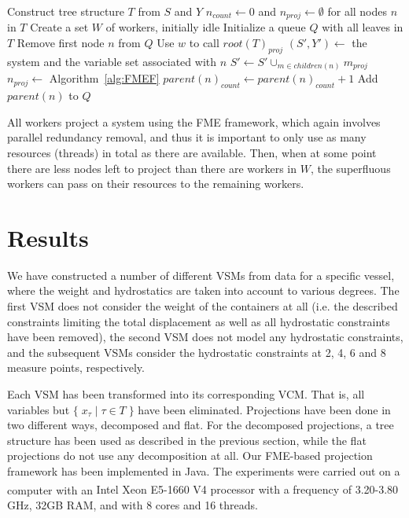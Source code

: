 \documentclass[citeauthoryear]{llncs}
\newcommand{\mi}{\mathit}
\newcommand{\set}[2]{\{\;{#1}\;|\;{#2}\;\}}
\begin{document}
\begin{algorithmic}
	\State Construct  tree structure $T$ from $S$ and $Y$
	\State $n_{count}\gets 0$ and $n_{proj}\gets\emptyset$ for all nodes $n$ in $T$
	\State Create a set $W$ of workers, initially idle
	\State Initialize a queue $Q$ with all leaves in $T$
	\While{$\mi{root}(T)_{proj} = \emptyset$}
			\State Remove first node $n$ from $Q$
			\State Use $w$ to call 
		\EndIf
	\EndWhile
	\State \Return $\mi{root}(T)_{proj}$
\EndFunction
\Statex
{}
	\State $(S',Y')\gets$ the system and the variable set associated with $n$
	\State $S'\gets S'\cup_{m\in \mi{children}(n)} m_{proj}$ 
	\State $n_{proj}\gets$  \Comment Algorithm~\ref{alg:FMEF}
	\State $\mi{parent}(n)_{count} \gets \mi{parent}(n)_{count} +1$
	\If{$\mi{parent}(n)_{count} = |\mi{children}(\mi{parent}(n))|$}
		\State Add $\mi{parent}(n)$ to $Q$
	\EndIf
	\State \Return
\EndFunction
\end{algorithmic}	

\vspace{1mm}
All workers project a system using the FME framework, which again involves parallel redundancy removal, and thus it is important to only use as many resources (threads) in total as there are available.
Then, when at some point there are less nodes left to project than there are workers in $W$, the superfluous workers can pass on their resources to the remaining workers.  

\section{Results}\label{sec:results}
We have constructed a number of different VSMs from data for a specific vessel, where the weight and hydrostatics are taken into account to various degrees. The first VSM does not consider the weight of the containers at all (i.e. the described constraints limiting the total displacement as well as all hydrostatic constraints have been removed), the second VSM does not model any hydrostatic constraints, and the subsequent VSMs consider the hydrostatic constraints at 2, 4, 6 and 8 measure points, respectively.

Each VSM has been transformed into its corresponding VCM. That is, all variables but $\set{x_\tau}{\tau\in T}$ have been eliminated. Projections have been done in two different ways, decomposed and flat. For the decomposed projections, a tree structure has been used as described in the previous section, while the flat projections do not use any decomposition at all. 
Our FME-based projection framework has been implemented in Java. The experiments were carried out on a computer with an {Intel\textsuperscript{\textregistered} Xeon\textsuperscript{\textregistered} E5-1660 V4 processor with a frequency of 3.20-3.80 GHz, 32GB RAM, and with 8 cores and 16 threads.}
\end{document}
